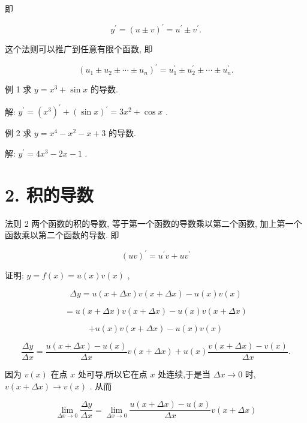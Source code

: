 \documentclass[lang=cn,newtx,10pt,scheme=chinese]{elegantbook}
\begin{document}
即

\[
{y}^{\prime } = {\left( u \pm v\right) }^{\prime } = {u}^{\prime } \pm {v}^{\prime }.
\]

这个法则可以推广到任意有限个函数, 即

\[
{\left( {u}_{1} \pm {u}_{2} \pm \cdots \pm {u}_{n}\right) }^{\prime } = {u}_{1}^{\prime } \pm {u}_{2}^{\prime } \pm \cdots \pm {u}_{n}^{\prime }.
\]

例 1 求 \(y = {x}^{3} + \sin x\) 的导数.

解: \({y}^{\prime } = {\left( {x}^{3}\right) }^{\prime } + {\left( \sin x\right) }^{\prime } = 3{x}^{2} + \cos x\) .

例 2 求 \(y = {x}^{4} - {x}^{2} - x + 3\) 的导数.

解: \({y}^{\prime } = 4{x}^{3} - {2x} - 1\) .

\section*{2. 积的导数}

法则 2 两个函数的积的导数, 等于第一个函数的导数乘以第二个函数, 加上第一个函数乘以第二个函数的导数. 即

\[
{\left( uv\right) }^{\prime } = {u}^{\prime }v + u{v}^{\prime }
\]

证明: \(y = f\left( x\right) = u\left( x\right) v\left( x\right)\) ,

\[
{\Delta y} = u\left( {x + {\Delta x}}\right) v\left( {x + {\Delta x}}\right) - u\left( x\right) v\left( x\right)
\]

\[
= u\left( {x + {\Delta x}}\right) v\left( {x + {\Delta x}}\right) - u\left( x\right) v\left( {x + {\Delta x}}\right)
\]

\[
+ u\left( x\right) v\left( {x + {\Delta x}}\right) - u\left( x\right) v\left( x\right)
\]

\[
\frac{\Delta y}{\Delta x} = \frac{u\left( {x + {\Delta x}}\right) - u\left( x\right) }{\Delta x}v\left( {x + {\Delta x}}\right) + u\left( x\right) \frac{v\left( {x + {\Delta x}}\right) - v\left( x\right) }{\Delta x}.
\]

因为 \(v\left( x\right)\) 在点 \(x\) 处可导,所以它在点 \(x\) 处连续,于是当 \({\Delta x} \rightarrow 0\) 时, \(v\left( {x + {\Delta x}}\right) \rightarrow v\left( x\right)\) . 从而

\[
\mathop{\lim }\limits_{{{\Delta x} \rightarrow 0}}\frac{\Delta y}{\Delta x} = \mathop{\lim }\limits_{{{\Delta x} \rightarrow 0}}\frac{u\left( {x + {\Delta x}}\right) - u\left( x\right) }{\Delta x}v\left( {x + {\Delta x}}\right)
\]
\end{document}
